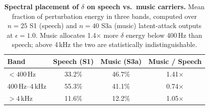 \begin{table}[H]
\centering
\scriptsize
\caption{\textbf{Spectral placement of $\delta$ on speech vs.\ music carriers.} Mean fraction of perturbation energy in three bands, computed over $n{=}25$ S1 (speech) and $n{=}40$ S3a (music) latent-attack outputs at $\epsilon{=}1.0$. Music allocates 1.4$\times$ more $\delta$ energy below 400\,Hz than speech; above 4\,kHz the two are statistically indistinguishable.}
\label{tab:bark_band_speech_vs_music}
\begin{tabular}{lccc}
\toprule
\textbf{Band} & \textbf{Speech (S1)} & \textbf{Music (S3a)} & \textbf{Music / Speech} \\
\midrule
$<400$\,Hz & 33.2\% & 46.7\% & 1.41$\times$ \\
$400$\,Hz--$4$\,kHz & 55.3\% & 41.1\% & 0.74$\times$ \\
$>4$\,kHz & 11.6\% & 12.2\% & 1.05$\times$ \\
\bottomrule
\end{tabular}
\end{table}
